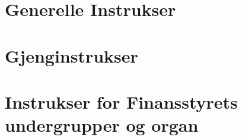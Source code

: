 \documentclass[11pt, a4paper, twosided]{book}
\renewcommand{\part}[1]{
    \cleardoublepage
    \addcontentsline{toc}{part}{#1}
    \vspace*{7cm}
    \begin{center}
        {\Huge\textbf{ #1}}
        \vfill
        \texttt{[image: anniversary2010-logo]}
    \end{center}
    \thispagestyle{empty}
    \cleardoublepage
}
\begin{document}
\chapter*{Generelle Instrukser}












\chapter*{Gjenginstrukser}




































\chapter*{Instrukser for Finansstyrets undergrupper og organ}







\end{document}
